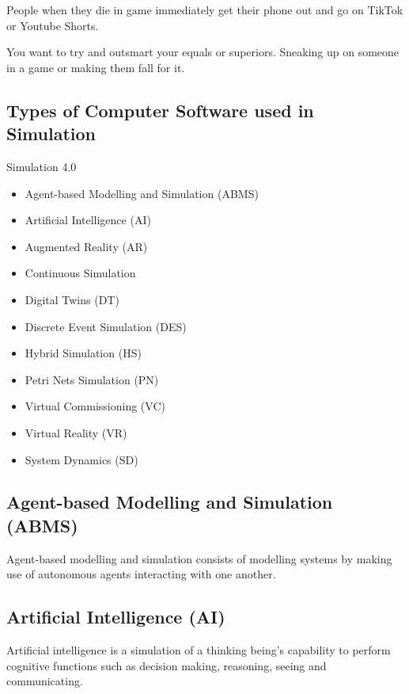 \documentclass{article}
\begin{document}
People when they die in game immediately get their phone out and go on TikTok or Youtube Shorts.

You want to try and outsmart your equals or superiors. Sneaking up on someone in a game or making them fall for it.

\subsection{Types of Computer Software used in Simulation}

Simulation 4.0 \cite{DEPAULAFERREIRA2020106868}

\begin{itemize}
    \item Agent-based Modelling and Simulation (ABMS)
    \item Artificial Intelligence (AI)
    \item Augmented Reality (AR)
    \item Continuous Simulation
    \item Digital Twins (DT)
    \item Discrete Event Simulation (DES)
    \item Hybrid Simulation (HS)
    \item Petri Nets Simulation (PN)
    \item Virtual Commissioning (VC)
    \item Virtual Reality (VR)    
    \item System Dynamics (SD)    
\end{itemize}

\subsection{Agent-based Modelling and Simulation (ABMS)}

Agent-based modelling and simulation consists of modelling systems by making use of autonomous agents interacting with one another. \cite{1574234}

\subsection{Artificial Intelligence (AI)}

Artificial intelligence is a simulation of a thinking being's capability to perform cognitive functions such as decision making, reasoning, seeing and communicating.

\end{document}

